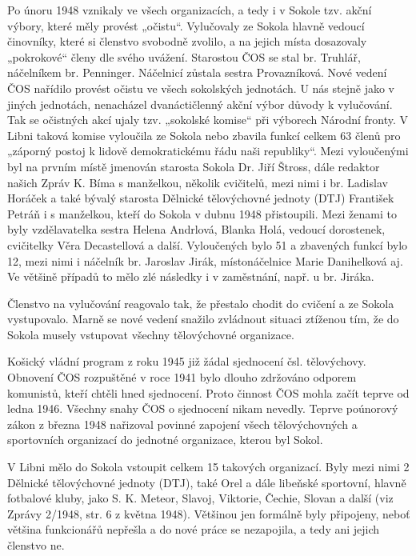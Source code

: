 Po únoru 1948 vznikaly ve všech organizacích, a tedy i v Sokole tzv.
akční výbory, které měly provést „očistu``. Vylučovaly ze Sokola hlavně
vedoucí činovníky, které si členstvo svobodně zvolilo, a na jejich místa
dosazovaly „pokrokové`` členy dle svého uvážení. Starostou ČOS se stal
br. Truhlář, náčelníkem br. Penninger. Náčelnicí zůstala sestra
Provazníková. Nové vedení ČOS nařídilo provést očistu ve všech
sokolských jednotách. U nás stejně jako v jiných jednotách, nenacházel
dvanáctičlenný akční výbor důvody k vylučování. Tak se očistných akcí
ujaly tzv. „sokolské komise`` při výborech Národní fronty. V Libni
taková komise vyloučila ze Sokola nebo zbavila funkcí celkem 63 členů
pro „záporný postoj k lidově demokratickému řádu naši republiky``. Mezi
vyloučenými byl na prvním místě jmenován starosta Sokola Dr. Jiří
Štross, dále redaktor našich Zpráv K. Bíma s manželkou, několik
cvičitelů, mezi nimi i br. Ladislav Horáček a také bývalý starosta
Dělnické tělovýchovné jednoty (DTJ) František Petráň i s manželkou,
kteří do Sokola v dubnu 1948 přistoupili. Mezi ženami to byly
vzdělavatelka sestra Helena Andrlová, Blanka Holá, vedoucí dorostenek,
cvičitelky Věra Decastellová a další. Vyloučených bylo 51 a zbavených
funkcí bylo 12, mezi nimi i náčelník br. Jaroslav Jirák, místonáčelnice
Marie Danihelková aj. Ve většině případů to mělo zlé následky i v
zaměstnání, např. u br. Jiráka.

Členstvo na vylučování reagovalo tak, že přestalo chodit do cvičení a ze
Sokola vystupovalo. Marně se nové vedení snažilo zvládnout situaci
ztíženou tím, že do Sokola musely vstupovat všechny tělovýchovné
organizace.

Košický vládní program z roku 1945 již žádal sjednocení čsl.
tělovýchovy. Obnovení ČOS rozpuštěné v roce 1941 bylo dlouho zdržováno
odporem komunistů, kteří chtěli hned sjednocení. Proto činnost ČOS mohla
začít teprve od ledna 1946. Všechny snahy ČOS o sjednocení nikam
nevedly. Teprve poúnorový zákon z března 1948 nařizoval povinné zapojení
všech tělovýchovných a sportovních organizací do jednotné organizace,
kterou byl Sokol.

V Libni mělo do Sokola vstoupit celkem 15 takových organizací. Byly mezi
nimi 2 Dělnické tělovýchovné jednoty (DTJ), také Orel a dále libeňské
sportovní, hlavně fotbalové kluby, jako S. K. Meteor, Slavoj, Viktorie,
Čechie, Slovan a další (viz Zprávy 2/1948, str. 6 z května 1948).
Většinou jen formálně byly připojeny, neboť většina funkcionářů nepřešla
a do nové práce se nezapojila, a tedy ani jejich členstvo ne.


